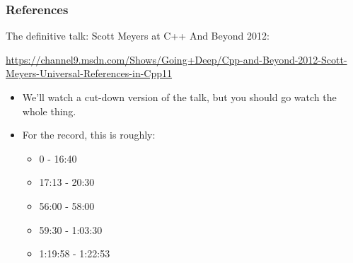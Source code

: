 




\begin{frame}[fragile,t]
\frametitle{References}
The definitive talk: Scott Meyers at C++ And Beyond 2012:

\url{https://channel9.msdn.com/Shows/Going+Deep/Cpp-and-Beyond-2012-Scott-Meyers-Universal-References-in-Cpp11}

\begin{itemize}[<+->]
\item We'll watch a cut-down version of the talk, but you should go
  watch the whole thing.
\item For the record, this is roughly:
\begin{itemize}
\item 0 - 16:40
\item 17:13 - 20:30
\item 56:00 - 58:00
\item 59:30 - 1:03:30
\item 1:19:58 - 1:22:53
\end{itemize}

\end{itemize}








\end{frame}


